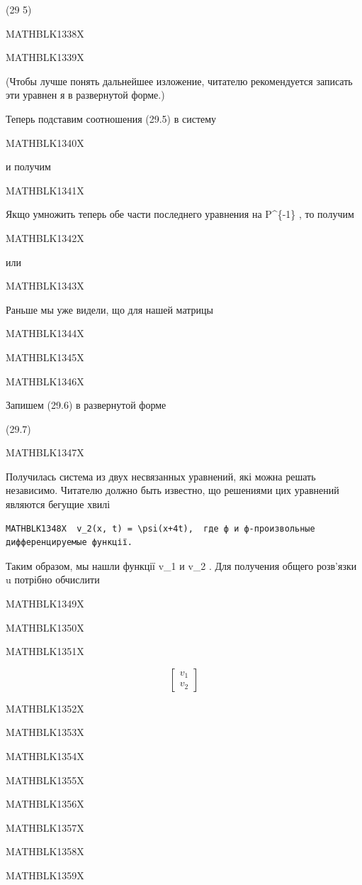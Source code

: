 \documentclass[
  ukrainian,
]{article}
\begin{document}
(29 5)

MATHBLK1338X

MATHBLK1339X

(Чтобы лучше понять дальнейшее изложение, читателю рекомендуется
записать эти уравнен я в развернутой форме.)

Теперь подставим соотношения (29.5) в систему

MATHBLK1340X

и получим

MATHBLK1341X

Якщо умножить теперь обе части последнего уравнения на P\^{}\{-1\} , то
получим

MATHBLK1342X

или

MATHBLK1343X

Раньше мы уже видели, що для нашей матрицы

MATHBLK1344X

MATHBLK1345X

MATHBLK1346X

Запишем (29.6) в развернутой форме

(29.7)

MATHBLK1347X

Получилась система из двух несвязанных уравнений, які можна решать
независимо. Читателю должно быть известно, що решениями цих уравнений
являются бегущие хвилі

\begin{verbatim}
MATHBLK1348X  v_2(x, t) = \psi(x+4t),  где ф и ф-произвольные дифференцируемые функції.
\end{verbatim}

Таким образом, мы нашли функції v\_1 и v\_2 . Для получения общего
розв'язки u потрібно обчислити

MATHBLK1349X

MATHBLK1350X

MATHBLK1351X

\[
\begin{bmatrix} v_1 \\ v_2 \end{bmatrix}
\]

MATHBLK1352X

MATHBLK1353X

MATHBLK1354X

MATHBLK1355X

MATHBLK1356X

MATHBLK1357X

MATHBLK1358X

MATHBLK1359X
\end{document}
